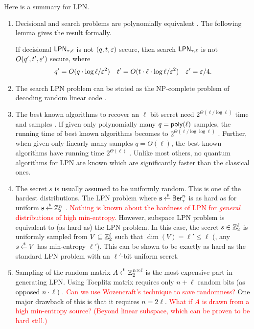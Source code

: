 \noindent Here is a summary for LPN. 
\begin{enumerate}
	\item Decisional and search problems are polynomially equivalent \cite{C:BFKL93,JC:KatShiSmi10}.
	The following lemma gives the result formally.
	
	\begin{importedlemma}
		If decisional $\mathsf{LPN}_{\tau, \ell}$ is not $(q,t,\varepsilon)$ secure, then search $\mathsf{LPN}_{\tau,\ell}$ is not $O(q',t',\varepsilon')$ secure, where
		\begin{align*}
			q' = O(q\cdot \log \ell/\varepsilon^2) & & t' = O(t\cdot \ell \cdot \log \ell/\varepsilon^2) & & \varepsilon' = \varepsilon/4.
		\end{align*}
	\end{importedlemma}
	
	\item The search LPN problem can be stated as the NP-complete problem of decoding random linear code \cite{BerlMcElTilb78}.
	\item The best known algorithms to recover an $ \ell $ bit secret need $ 2^{\Theta(\ell / \log \ell)} $ time and samples \cite{STOC:BluKalWas00,Levieil06}. 
	If given only polynomially many $ q = \mathsf{poly}(\ell) $ samples, the running time of best known algorithms becomes to $ 2^{\Theta(\ell/ \log \log \ell)} $ \cite{Lyubashevsky05}.
	Further, when given only linearly many samples $ q = \Theta(\ell) $, the best known algorithms have running time $ 2^{\Theta(\ell)} $ \cite{AC:MayMeuTho11,Jacques89}. 
	Unlike most others, no quantum algorithms for LPN are known which are significantly faster than the classical ones. 
	
	\item The secret $ s $ is usually assumed to be uniformly random. 
	This is one of the hardest distributions.  
	The LPN problem where $ \mathbf{s} \mathbin{\stackrel{\mbox{\,\tiny \$}}{\gets}} \mathsf{Ber}^n_\tau $ is as hard as for uniform $ \mathbf{s} \mathbin{\stackrel{\mbox{\,\tiny \$}}{\gets}}  {\mathbb Z}^n_2 $ \cite{C:ACPS09}. 
	\textcolor{red}{Nothing is known about the hardness of LPN for \textit{general} distributions of high min-entropy.} 
	However, subspace LPN problem \cite{Piet12} is equivalent to (as hard as) the LPN problem. 
	In this case, the secret $s \in {\mathbb Z}^\ell_2$ is uniformly sampled from $V \subseteq {\mathbb Z}^\ell_2$ such that $\dim(V) = \ell' \leq \ell$ (\ie, any $s \mathbin{\stackrel{\mbox{\,\tiny \$}}{\gets}} V$ has min-entropy $\ell'$).
	This can be shown to be exactly as hard as the standard LPN problem with an $\ell'$-bit uniform secret.
	
	\item Sampling of the random matrix $ A  \mathbin{\stackrel{\mbox{\,\tiny \$}}{\gets}} {\mathbb Z}^{n\times \ell}_2 $ is the most expensive part in generating LPN. 
	Using Toeplitz matrix requires only $ n + \ell $ random bits (as opposed $ n \cdot \ell $) \cite{EC:GilRobSeu08}. 
	\textcolor{red}{Can we use  Wozencraft's technique to save randomness?} 
	One major drawback of this is that it requires $ n = 2 \ell $.
	\textcolor{red}{What if $A$ is drawn from a high min-entropy source? (Beyond linear subspace, which can be proven to be hard still.)}
	

\end{enumerate}
